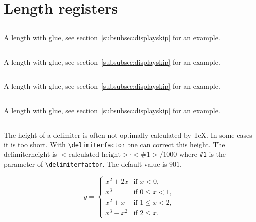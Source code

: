 \begin{table}[htb]
\section{Length registers}

\subsection{}
A length with glue, see section~\ref{subsubsec:displayskip} for an example.

\subsection{}
A length with glue, see section~\ref{subsubsec:displayskip} for an example.

\subsection{}
A length with glue, see section~\ref{subsubsec:displayskip} for an example.

\subsection{}
A length with glue, see section~\ref{subsubsec:displayskip} for an example.


\subsection{}
The height of a delimiter is often not optimally calculated by \TeX{}. In some cases it is    %
too short. With \verb+\delimiterfactor+ one can correct this height. The delimiterheight
is $<\textrm{calculated height}>\cdot <\textrm{\#1}>/1000$ where \verb+#1+ is the parameter of
\verb+\delimiterfactor+. The default value is $901$.

\begin{LTXexample}[width=0.4\linewidth]
\[
y = \left\{%
 \begin{array}{ll}
   x^2+2x  &\textrm{if }x<0,\\
   x^3     &\textrm{if }0\le x<1,\\
   x^2+x   &\textrm{if }1\le x<2,\\
   x^3-x^2 &\textrm{if }2\le x.
 \end{array}%
\right.
\]
\end{LTXexample}


\end{table}

